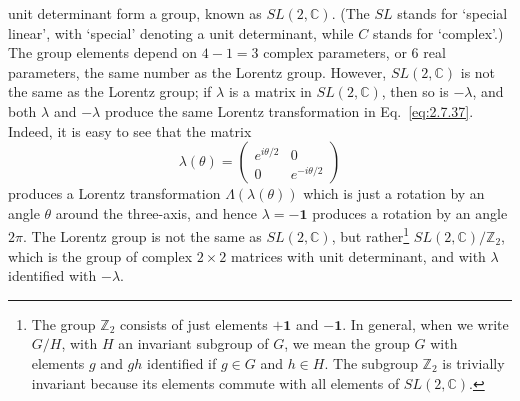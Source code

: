 unit determinant form a group, known as $SL(2,\mathbb{C})$. (The $SL$ stands for
`special linear', with `special' denoting a unit determinant, while $C$ stands
for `complex'.) The group elements depend on $4-1=3$ complex parameters, or 6
real parameters, the same number as the Lorentz group. However, $SL(2,\mathbb{C})$ is
not the same as the Lorentz group; if $\lambda$ is a matrix in $SL(2,\mathbb{C})$, then
so is $-\lambda$, and both $\lambda$ and $-\lambda$ produce the same Lorentz
transformation in Eq.~\eqref{eq:2.7.37}. Indeed, it is easy to see that the matrix
\begin{equation*}
  \lambda(\theta)=
  \begin{pmatrix}
    e^{i\theta/2} & 0\\
    0 & e^{-i\theta/2}
  \end{pmatrix}
\end{equation*}
produces a Lorentz transformation $\Lambda(\lambda(\theta))$ which is just a
rotation by an angle $\theta$ around the three-axis, and hence
$\lambda=-\mathbf{1}$ produces a rotation by an angle $2\pi$. The Lorentz group
is not the same as $SL(2,\mathbb{C})$, but rather\footnote{The group $\mathbb{Z}_2$ consists of just
elements $+\mathbf{1}$ and $-\mathbf{1}$. In general, when we write $G/H$, with
$H$ an invariant subgroup of $G$, we mean the group $G$ with elements $g$ and
$gh$ identified if $g\in G$ and $h\in H$. The subgroup $\mathbb{Z}_2$ is trivially
invariant because its elements commute with all elements of $SL(2,\mathbb{C})$.}
$SL(2,\mathbb{C})/\mathbb{Z}_2$, which is the group of complex $2\times2$ matrices with unit
determinant, and with $\lambda$ identified with $-\lambda$.


